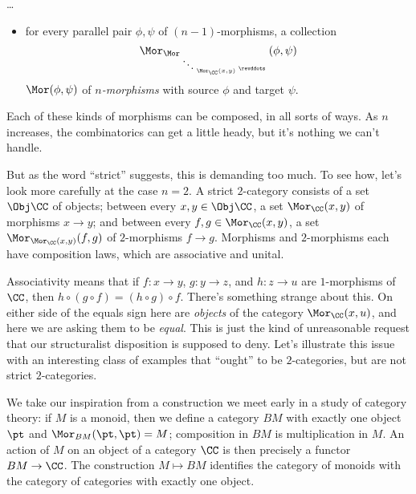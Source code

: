 \dots

\begin{itemize}
  \item for every parallel pair $\phi, \psi$ of $(n-1)$-morphisms, a collection
    \[
    \Mor_{\Mor_{\;{\ddots}_{\;\Mor_{\CC}(x,y)\;}{\revddots}\;}}(\phi,\psi)
    \]
    $\Mor(\phi,\psi)$ of \emph{$n$-morphisms} with source $\phi$ and target $\psi$.
\end{itemize} 
Each of these kinds of morphisms can be composed, in all sorts of ways.
As $n$ increases, the combinatorics can get a little heady, but it's nothing we can't handle.

But as the word \enquote{strict} suggests, this is demanding too much.
To see how, let's look more carefully at the case $n = 2$.
A strict $2$-category consists of a set $\Obj \CC$ of objects;
between every $x,y \in \Obj \CC$, a set $\Mor_{\CC}(x,y)$ of morphisms $x \to y$; and
between every $f,g \in \Mor_{\CC}(x,y)$, a set $\Mor_{\Mor_{\CC}(x,y)}(f,g)$ of $2$-morphisms $f \to g$.
Morphisms and $2$-morphisms each have composition laws, which are associative and unital.

Associativity means that if $f \colon x \to y$, $g \colon y \to z$, and $h \colon z \to u$ are $1$-morphisms of $\CC$, then $h \circ (g \circ f) = (h \circ g) \circ f$.
There's something strange about this.
On either side of the equals sign here are \emph{objects} of the category $\Mor_{\CC}(x,u)$, and here we are asking them to be \emph{equal}.
This is just the kind of unreasonable request that our structuralist disposition is supposed to deny.
Let's illustrate this issue with an interesting class of examples that \enquote{ought} to be $2$-categories, but are not strict $2$-categories.

We take our inspiration from a construction we meet early in a study of category theory:
if $M$ is a monoid, then we define a category $BM$ with exactly one object $\pt$ and $\Mor_{BM}(\pt,\pt) = M$;
composition in $BM$ is multiplication in $M$.
An action of $M$ on an object of a category $\CC$ is then precisely a functor $BM \to \CC$.
The construction $M \mapsto BM$ identifies the category of monoids with the category of categories with exactly one object.

